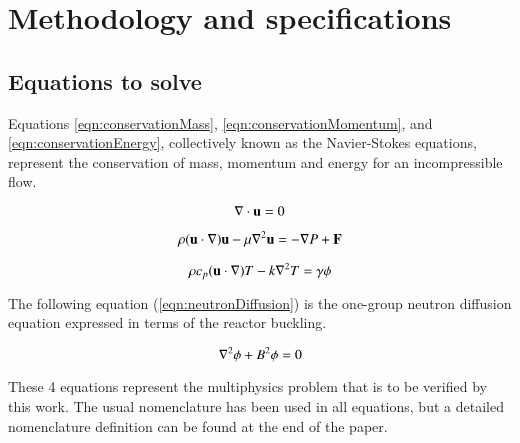 
\section{Methodology and specifications}



\subsection{Equations to solve}

Equations \ref{eqn:conservationMass}, \ref{eqn:conservationMomentum}, and \ref{eqn:conservationEnergy}, collectively known as the Navier-Stokes equations, represent the conservation of mass, momentum and energy for an incompressible flow.

\begin{equation}
    \conservationMass
\end{equation}

\begin{equation}
    \conservationMomentum
\end{equation}

\begin{equation}
    \conservationEnergy
\end{equation}



The following equation (\ref{eqn:neutronDiffusion}) is the one-group neutron diffusion equation expressed in terms of the reactor buckling.

\begin{equation}
    \neutronDiffusion
\end{equation}


These 4 equations represent the multiphysics problem that is to be verified by this work.
The usual nomenclature has been used in all equations, but a detailed nomenclature definition can be found at the end of the paper.


